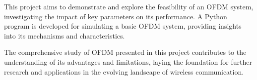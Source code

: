 This project aims to demonstrate and explore the feasibility of an OFDM system, investigating the impact of key parameters on its performance. A Python program is developed for simulating a basic OFDM system, providing insights into its mechanisms and characteristics.

The comprehensive study of OFDM presented in this project contributes to the understanding of its advantages and limitations, laying the foundation for further research and applications in the evolving landscape of wireless communication.
\newpage
\cleardoublepage